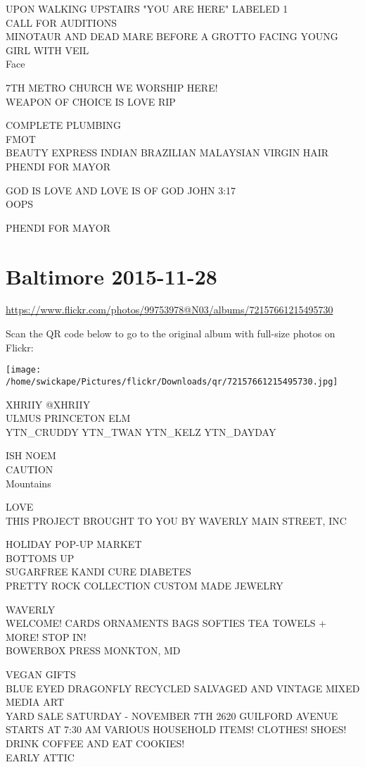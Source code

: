 \documentclass[10pt,letterpaper]{article}
\begin{document}
UPON WALKING UPSTAIRS "YOU ARE HERE" LABELED 1\\
CALL FOR AUDITIONS\\
MINOTAUR AND DEAD MARE BEFORE A GROTTO FACING YOUNG GIRL WITH VEIL\\
Face

7TH METRO CHURCH WE WORSHIP HERE!\\
WEAPON OF CHOICE IS LOVE RIP

COMPLETE PLUMBING\\
FMOT\\
BEAUTY EXPRESS INDIAN BRAZILIAN MALAYSIAN VIRGIN HAIR\\
PHENDI FOR MAYOR

GOD IS LOVE AND LOVE IS OF GOD JOHN 3:17\\
OOPS

PHENDI FOR MAYOR


\section*{Baltimore 2015-11-28}

\url{https://www.flickr.com/photos/99753978@N03/albums/72157661215495730}

Scan the QR code below to go to the original album with full-size photos on Flickr:

\texttt{[image: /home/swickape/Pictures/flickr/Downloads/qr/72157661215495730.jpg]}


XHRIIY @XHRIIY\\
ULMUS PRINCETON ELM\\
YTN\_CRUDDY YTN\_TWAN YTN\_KELZ YTN\_DAYDAY

ISH NOEM\\
CAUTION\\
Mountains

LOVE\\
THIS PROJECT BROUGHT TO YOU BY WAVERLY MAIN STREET, INC

HOLIDAY POP{-}UP MARKET\\
BOTTOMS UP\\
SUGARFREE KANDI CURE DIABETES\\
PRETTY ROCK COLLECTION CUSTOM MADE JEWELRY

WAVERLY\\
WELCOME!  CARDS ORNAMENTS BAGS SOFTIES TEA TOWELS + MORE! STOP IN!\\
BOWERBOX PRESS MONKTON, MD

VEGAN GIFTS\\
BLUE EYED DRAGONFLY RECYCLED SALVAGED AND VINTAGE MIXED MEDIA ART\\
YARD SALE SATURDAY {-} NOVEMBER 7TH 2620 GUILFORD AVENUE STARTS AT 7:30 AM VARIOUS HOUSEHOLD ITEMS!  CLOTHES!  SHOES!  DRINK COFFEE AND EAT COOKIES!\\
EARLY ATTIC
\end{document}
